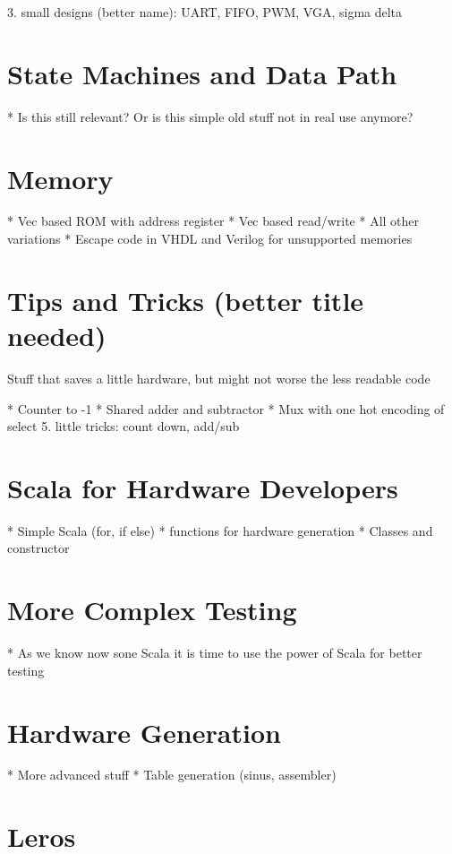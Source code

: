 \documentclass[%
    10pt, %
    headinclude, footexclude,
    openright, %
    notitlepage,
    cleardoubleempty,
    headsepline,
    pointlessnumbers,
    bibtotoc, idxtotoc,
    ]{scrbook}
\begin{document}
3. small designs (better name): UART, FIFO, PWM, VGA, sigma delta

\section{State Machines and Data Path}

 * Is this still relevant? Or is this simple old stuff not in real use anymore?

\section{Memory}

 * Vec based ROM with address register
 * Vec based read/write
 * All other variations
 * Escape code in VHDL and Verilog for unsupported memories

\section{Tips and Tricks (better title needed)}

Stuff that saves a little hardware, but might not worse the less readable code

 * Counter to -1
 * Shared adder and subtractor
 * Mux with one hot encoding of select
 5. little tricks: count down, add/sub


\section{Scala for Hardware Developers}

 * Simple Scala (for, if else)
 * functions for hardware generation
 * Classes and constructor
 
 \section{More Complex Testing}
 
  * As we know now sone Scala it is time to use the power of Scala for better testing

\section{Hardware Generation}

 * More advanced stuff
 * Table generation (sinus, assembler)
 
 \section{Leros}
 
\end{document}
